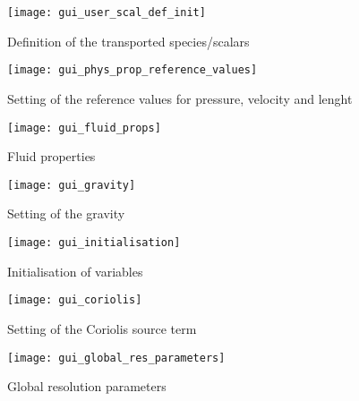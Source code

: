 {{\begin{figure}[!ht]
\begin{center}
\texttt{[image: gui\_user\_scal\_def\_init]}
\caption{Definition of the transported species/scalars}
\label{fig:gui_species}
\end{center}
\end{figure}

\begin{figure}[!ht]
\begin{center}
\texttt{[image: gui\_phys\_prop\_reference\_values]}
\caption{Setting of the reference values for pressure, velocity and lenght}
\label{fig:gui_reference_values}
\end{center}
\end{figure}

\begin{figure}[!ht]
\begin{center}
\texttt{[image: gui\_fluid\_props]}
\caption{Fluid properties}
\label{fig:gui_fluid_props}
\end{center}
\end{figure}

\begin{figure}[!ht]
\begin{center}
\texttt{[image: gui\_gravity]}
\caption{Setting of the gravity}
\label{fig:gui_gravity}
\end{center}
\end{figure}

\begin{figure}[!ht]
\begin{center}
\texttt{[image: gui\_initialisation]}
\caption{Initialisation of variables}
\label{fig:gui_initialisation}
\end{center}
\end{figure}


\begin{figure}[!ht]
\begin{center}
\texttt{[image: gui\_coriolis]}
\caption{Setting of the Coriolis source term}
\label{fig:gui_coriolis}
\end{center}
\end{figure}

\begin{figure}[!ht]
\begin{center}
\texttt{[image: gui\_global\_res\_parameters]}
\caption{Global resolution parameters}
\label{fig:gui_global_parameters}
\end{center}
\end{figure}

}}
